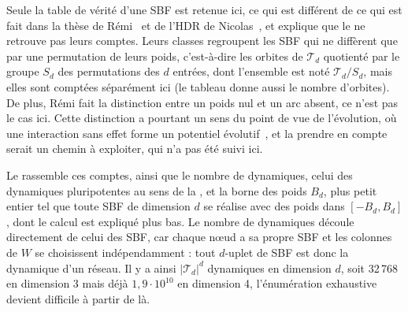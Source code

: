 \documentclass[12pt, a4paper]{article}
\begin{document}
Seule la table de vérité d'une SBF est retenue ici, ce qui est différent de ce qui est fait dans la thèse de Rémi~\cite{segretain2023} et de l'HDR de Nicolas~\cite{glade2022}, et explique que le  ne retrouve pas leurs comptes.
Leurs classes regroupent les SBF qui ne diffèrent que par une permutation de leurs poids, c'est-à-dire les orbites de $\mathcal{T}_d$ quotienté par le groupe $S_d$ des permutations des $d$ entrées, dont l'ensemble est noté $\mathcal{T}_d/S_d$, mais elles sont comptées séparément ici (le tableau donne aussi le nombre d'orbites).
De plus, Rémi fait la distinction entre un poids nul et un arc absent, ce n'est pas le cas ici.
Cette distinction a pourtant un sens du point de vue de l'évolution, où une interaction sans effet forme un potentiel évolutif~\cite{segretain2023}, et la prendre en compte serait un chemin à exploiter, qui n'a pas été suivi ici.

Le  rassemble ces comptes, ainsi que le nombre de dynamiques, celui des dynamiques pluripotentes au sens de la , et la borne des poids $B_d$, plus petit entier tel que toute SBF de dimension $d$ se réalise avec des poids dans $[-B_d, B_d]$, dont le calcul est expliqué plus bas.
Le nombre de dynamiques découle directement de celui des SBF, car chaque nœud a sa propre SBF et les colonnes de $W$ se choisissent indépendamment : tout $d$-uplet de SBF est donc la dynamique d'un réseau.
Il y a ainsi $|\mathcal{T}_d|^d$ dynamiques en dimension $d$, soit 32\,768 en dimension 3 mais déjà $1{,}9 \cdot 10^{10}$ en dimension 4, l'énumération exhaustive devient difficile à partir de là.
\end{document}
